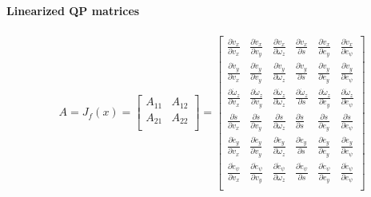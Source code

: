\documentclass[12pt]{article}
\begin{document}
        \paragraph{Linearized QP matrices}
        \begin{equation}
            \begin{aligned}
                & A = J_f(x) 
                = 
                \begin{bmatrix} 
                    A_{11} & A_{12} \\
                    A_{21} & A_{22} \\
                \end{bmatrix}
                =
                \begin{bmatrix} 
                    \frac{\partial \dot{v}_x}{\partial v_x} & \frac{\partial \dot{v}_x}{\partial v_y} & \frac{\partial \dot{v}_x}{\partial \omega_z} & \frac{\partial \dot{v}_x}{\partial s} & \frac{\partial \dot{v}_x}{\partial e_y} &  \frac{\partial \dot{v}_x}{\partial e_{\psi}} \\
                    \frac{\partial \dot{v}_y}{\partial v_x} & \frac{\partial \dot{v}_y}{\partial v_y} & \frac{\partial \dot{v}_y}{\partial \omega_z} & \frac{\partial \dot{v}_y}{\partial s} & \frac{\partial \dot{v}_y}{\partial e_y} & \frac{\partial \dot{v}_y}{\partial e_{\psi}}\\
                    \frac{\partial \dot{\omega}_z}{\partial v_x} & \frac{\partial \dot{\omega}_z}{\partial v_y} & \frac{\partial \dot{\omega}_z}{\partial \omega_z} & \frac{\partial \dot{\omega}_z}{\partial s} & \frac{\partial \dot{\omega}_z}{\partial e_y} & \frac{\partial \dot{\omega}_z}{\partial e_{\psi}} \\
                    \frac{\partial \dot{s}}{\partial v_x} & \frac{\partial \dot{s}}{\partial v_y} & \frac{\partial \dot{s}}{\partial \omega_z} & \frac{\partial \dot{s}}{\partial s} & \frac{\partial \dot{s}}{\partial e_y} & \frac{\partial \dot{s}}{\partial e_{\psi}} \\ 
                    \frac{\partial \dot{e}_y}{\partial v_x} & \frac{\partial \dot{e}_y}{\partial v_y} & \frac{\partial \dot{e}_y}{\partial \omega_z} & \frac{\partial \dot{e}_y}{\partial s} & \frac{\partial \dot{e}_y}{\partial e_y} & \frac{\partial \dot{e}_y}{\partial e_{\psi}} \\ 
                    \frac{\partial \dot{e}_{\psi}}{\partial v_x} & \frac{\partial \dot{e}_{\psi}}{\partial v_y} & \frac{\partial \dot{e}_{\psi}}{\partial \omega_z} & \frac{\partial \dot{e}_{\psi}}{\partial s} & \frac{\partial \dot{e}_{\psi}}{\partial e_y} & \frac{\partial \dot{e}_{\psi}}{\partial e_{\psi}} \\ 
                \end{bmatrix}
            \end{aligned}
        \end{equation}
\end{document}
